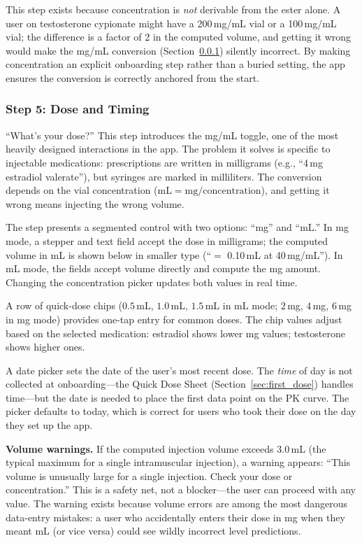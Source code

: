 \documentclass[11pt,a4paper]{article}
\begin{document}
This step exists because concentration is \emph{not} derivable from the
ester alone. A user on testosterone cypionate might have a 200\,mg/mL
vial or a 100\,mg/mL vial; the difference is a factor of 2 in the
computed volume, and getting it wrong would make the mg/mL conversion
(Section~\ref{sec:dose_step}) silently incorrect. By making concentration
an explicit onboarding step rather than a buried setting, the app ensures
the conversion is correctly anchored from the start.

\subsubsection{Step 5: Dose and Timing}
\label{sec:dose_step}

``What's your dose?'' This step introduces the mg/mL toggle, one of the
most heavily designed interactions in the app. The problem it solves is
specific to injectable medications: prescriptions are written in
milligrams (e.g., ``4\,mg estradiol valerate''), but syringes are marked
in milliliters. The conversion depends on the vial concentration
($\text{mL} = \text{mg} / \text{concentration}$), and getting it wrong
means injecting the wrong volume.

The step presents a segmented control with two options: ``mg'' and
``mL.'' In mg mode, a stepper and text field accept the dose in
milligrams; the computed volume in mL is shown below in smaller type
(``$=$ 0.10\,mL at 40\,mg/mL''). In mL mode, the fields accept volume
directly and compute the mg amount. Changing the concentration picker
updates both values in real time.

A row of quick-dose chips ($0.5$\,mL, $1.0$\,mL, $1.5$\,mL in mL mode;
$2$\,mg, $4$\,mg, $6$\,mg in mg mode) provides one-tap entry for common
doses. The chip values adjust based on the selected medication: estradiol
shows lower mg values; testosterone shows higher ones.

A date picker sets the date of the user's most recent dose. The
\emph{time} of day is not collected at onboarding---the Quick Dose Sheet
(Section~\ref{sec:first_dose}) handles time---but the date is needed to
place the first data point on the PK curve. The picker defaults to
today, which is correct for users who took their dose on the day they
set up the app.

\textbf{Volume warnings.} If the computed injection volume exceeds
3.0\,mL (the typical maximum for a single intramuscular injection), a
warning appears: ``This volume is unusually large for a single injection.
Check your dose or concentration.'' This is a safety net, not a
blocker---the user can proceed with any value. The warning exists because
volume errors are among the most dangerous data-entry mistakes: a user
who accidentally enters their dose in mg when they meant mL (or vice
versa) could see wildly incorrect level predictions.
\end{document}
